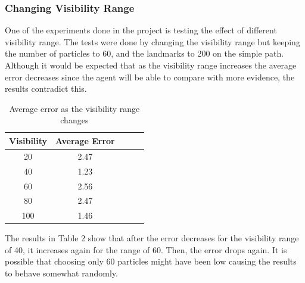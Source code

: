 \documentclass[a4paper,11pt]{report}
\begin{document}
		\subsubsection{Changing Visibility Range}
		One of the experiments done in the project is testing the effect of different visibility range. The tests were done by changing the visibility range but keeping the number of particles to 60, and the landmarks to 200 on the simple path. Although it would be expected that as the visibility range increases the average error decreases since the agent will be able to compare with more evidence, the results contradict this. 
		
			\begin {table}[h]\small
			\centering
			\begin{tabular*}{0.278\textwidth}[left]{|c|c|c|c|c|}
				\hline
				  Visibility & Average Error\\
				  \hline
				  20 & 2.47 \\
				  40 & 1.23 \\
				  60 & 2.56 \\
				  80 & 2.47 \\
				  100 & 1.46 \\
				  \hline
				
				\end{tabular*}
				    \caption{{\small Average error as the visibility range changes}}
				\end{table}
				
		The results in Table 2 show that after the error decreases for the visibility range of 40, it increases again for the range of 60. Then, the error drops again. It is possible that choosing only 60 particles might have been low causing the results to behave somewhat randomly.
		
\end{document}
